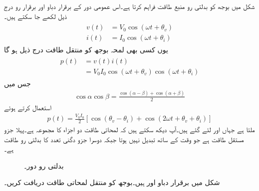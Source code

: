 
شکل  میں بوجھ  کو بدلتی رو منبع  طاقت فراہم کرتا ہے۔اس عمومی دور کے برقرار دباو اور برقرار رو درج ذیل لکھے جا سکتے ہیں۔
\begin{gather}
\begin{aligned}\label{مساوات_طاقت_دباو_رو_عمومی_الف}
v(t)&=V_0\cos(\omega t +\theta_v)\\
i(t)&=I_0\cos(\omega t +\theta_i)
\end{aligned}
\end{gather}
یوں کسی بھی لمحہ بوجھ کو منتقل طاقت درج ذیل ہو گا
\begin{gather}
\begin{aligned}
p(t)&=v(t)i(t)\\
&=V_0 I_0  \cos(\omega t +\theta_v) \cos(\omega t +\theta_i)
\end{aligned}
\end{gather}
جس میں
\begin{align}
\cos \alpha \cos \beta=\frac{\cos(\alpha-\beta)+\cos(\alpha+\beta)}{2}
\end{align}
استعمال کرتے ہوئے
\begin{align}\label{مساوات_طاقت_لمحاتی_طاقت_الف}
p(t)=\frac{V_0 I_0}{2}\left[\cos(\theta_v-\theta_i)+\cos(2\omega t +\theta_v+\theta_i)\right]
\end{align}
ملتا ہے جہاں  اور  لئے گئے ہیں۔آپ دیکھ سکتے ہیں کہ لمحاتی طاقت دو اجزاء کا مجموعہ ہے۔پہلا جزو مستقل طاقت ہے جو وقت کے ساتھ تبدیل نہیں ہوتا جبکہ دوسرا جزو دگنی تعدد کا بدلتی رو طاقت ہے۔  
%
\begin{figure}
\centering
{}
\caption{بدلتی رو دور۔}
\label{شکل_طاقت_پرزے_کو_منتقل}
\end{figure}
شکل  میں برقرار دباو  اور  ہیں۔بوجھ کو منتقل لمحاتی طاقت دریافت کریں۔

